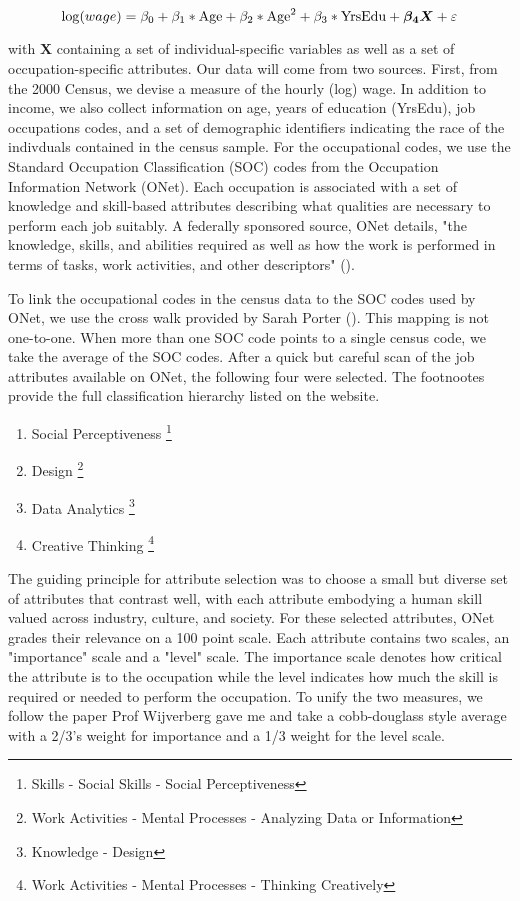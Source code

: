 \documentclass[12pt]{article}
\begin{document}
\begin{equation} \label{eq:mincer_equ}
  \log (wage) = \beta_{0} + \beta_{1} * \textnormal{Age} + \beta_{2} * \textnormal{Age}^{2} + \beta_{3} * \textnormal{YrsEdu} + \boldsymbol{\beta_{4}}\boldsymbol{X} + \varepsilon
\end{equation}

with $\boldsymbol{X}$ containing a set of individual-specific 
variables as well as a set of occupation-specific attributes. 
Our data will come from two sources. First, from the 2000 Census,
we devise a measure of the hourly (log) wage. In addition to income, we also collect information on age,
years of education (YrsEdu), job occupations codes, 
and a set of demographic identifiers indicating the race of the
indivduals contained in the census sample. For the occupational codes, we use
the Standard Occupation Classification (SOC) codes from the
Occupation Information Network (ONet). Each occupation is
associated with a set of knowledge and skill-based
attributes describing what qualities are necessary to perform each
job suitably. A federally sponsored source, ONet details, "the knowledge,
skills, and abilities required as well as how the work is
performed in terms of tasks, work activities, and other descriptors"
(\cite{ONET}).

To link the occupational codes in the census data to the SOC codes used
by ONet, we use the cross walk provided by Sarah Porter (\cite{Crosswalk}).
This mapping is not one-to-one. When more than one SOC code points to a single census
code, we take the average of the SOC codes. After a quick but careful scan of the job attributes
available on ONet, the following four were selected. The footnootes
provide the full classification hierarchy listed on the website. 

\begin{enumerate}
  \item Social Perceptiveness \footnote{Skills - Social Skills - Social Perceptiveness}
  \item Design \footnote{Work Activities - Mental Processes - Analyzing Data or Information}
  \item Data Analytics \footnote{Knowledge - Design}
  \item Creative Thinking \footnote{Work Activities - Mental Processes - Thinking Creatively}
\end{enumerate}

The guiding principle for attribute selection was to choose a small but
diverse set of attributes that contrast well, with each attribute embodying
a human skill valued across industry, culture, and society. For these selected
attributes, ONet grades their relevance on a
100 point scale. Each attribute contains two scales, an "importance"
scale and a "level" scale. The importance scale denotes how critical the
attribute is to the occupation while the level indicates how much the
skill is required or needed to perform the occupation. To unify the two
measures, we follow the paper Prof Wijverberg gave me and take a
cobb-douglass style average with a 2/3's weight for importance and a 1/3
weight for the level scale.
\end{document}
